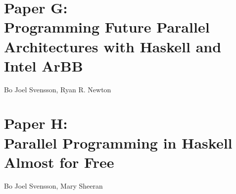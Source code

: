 \documentclass[a4paper]{book}
\newcommand{\paperG}{Paper G}
\newcommand{\paperGTitle}{Programming Future Parallel Architectures with Haskell and Intel ArBB}
\newcommand{\paperH}{Paper H}
\newcommand{\paperHTitle}{Parallel Programming in Haskell Almost for Free}
\begin{document}
\section[\paperGTitle]{\paperG: \\ \paperGTitle}
\label{sec:paperG}


\begin{center} 
Bo Joel Svensson, Ryan R. Newton
\end{center}




% 
\cleardoublepage 


\section[\paperHTitle]{\paperH: \\ \paperHTitle}
\label{sec:paperH}


\begin{center} 
Bo Joel Svensson, Mary Sheeran
\end{center}





\cleardoublepage






\end{document}
